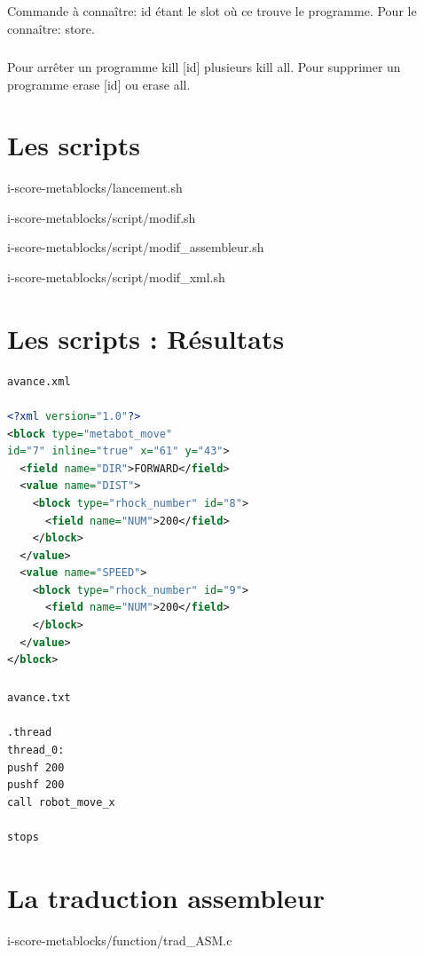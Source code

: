 \documentclass[10pt,a4paper]{report}
\begin{document}
\begin{appendices}
\paragraph{}
Commande à connaître:
id étant le slot où ce trouve le programme. Pour le connaître: store.
\paragraph{}
Pour arrêter un programme kill [id] plusieurs kill all. Pour supprimer un programme erase [id] ou erase all.

\chapter{Les scripts} 

{i-score-metablocks/lancement.sh}
\newpage

{i-score-metablocks/script/modif.sh}


{i-score-metablocks/script/modif_assembleur.sh}


{i-score-metablocks/script/modif_xml.sh}

\chapter{Les scripts : Résultats} 
\begin{lstlisting}[language=xml, frame=none]
avance.xml

<?xml version="1.0"?>
<block type="metabot_move" 
id="7" inline="true" x="61" y="43">
  <field name="DIR">FORWARD</field>
  <value name="DIST">
    <block type="rhock_number" id="8">
      <field name="NUM">200</field>
    </block>
  </value>
  <value name="SPEED">
    <block type="rhock_number" id="9">
      <field name="NUM">200</field>
    </block>
  </value>
</block>
\end{lstlisting}
\paragraph{}

\begin{verbatim}
avance.txt

.thread
thread_0:
pushf 200
pushf 200
call robot_move_x

stops 
\end{verbatim}
\chapter{La traduction assembleur} 

{i-score-metablocks/function/trad_ASM.c}


\end{appendices}
\end{document}
